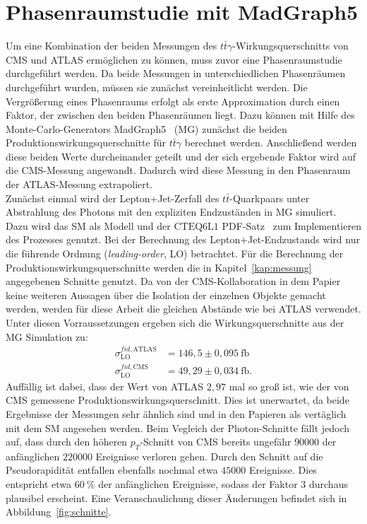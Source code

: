\section{Phasenraumstudie mit MadGraph5}
\label{phasencms}
Um eine Kombination der beiden Messungen des $t\bar{t}\gamma$-Wirkungsquerschnitts von CMS und ATLAS ermöglichen zu können, muss zuvor eine Phasenraumstudie durchgeführt werden. Da beide Messungen in unterschiedlichen Phasenräumen durchgeführt wurden, müssen sie zunächst vereinheitlicht werden. Die Vergrößerung eines Phasenraums erfolgt als erste Approximation durch einen Faktor, der zwischen den beiden Phasenräumen liegt. Dazu können mit Hilfe des Monte-Carlo-Generators MadGraph5~\cite{Alwall:2014hca} (MG) zunächst die beiden Produktionswirkungsquerschnitte für $t\bar{t}\gamma$ berechnet werden.
Anschließend werden diese beiden Werte durcheinander geteilt und der sich ergebende Faktor wird auf die CMS-Messung angewandt. Dadurch wird diese Messung in den Phasenraum der ATLAS-Messung extrapoliert.\\
Zunächst einmal wird der Lepton+Jet-Zerfall des $t\bar{t}$-Quarkpaars unter Abstrahlung des Photons mit den expliziten Endzuständen in MG simuliert.
Dazu wird das SM als Modell und der $\text{CTEQ}6\text{L}1$ PDF-Satz~\cite{Pumplin:2002vw} zum Implementieren des Prozesses genutzt. Bei der Berechnung des Lepton+Jet-Endzustands wird nur die führende Ordnung (\textit{leading-order}, LO) betrachtet. Für die Berechnung der Produktionswirkungsquerschnitte werden die in Kapitel~\ref{kap:messung} angegebenen Schnitte genutzt.
Da von der CMS-Kollaboration in dem Papier keine weiteren Aussagen über die Isolation der einzelnen Objekte gemacht werden, werden für diese Arbeit die gleichen Abstände wie bei ATLAS verwendet.
Unter diesen Vorraussetzungen ergeben sich die Wirkungsquerschnitte aus der MG Simulation zu:
\begin{align}
  \sigma^{fid, \text{ATLAS}}_{\text{LO}} &= 146,5 \pm 0,095~ \si{\femto\barn}\\
  \sigma^{fid, \text{CMS}}_{\text{LO}} &= 49,29 \pm 0,034~ \si{\femto\barn}.
\end{align}
Auffällig ist dabei, dass der Wert von ATLAS $2,97$ mal so groß ist, wie der von CMS gemessene Produktionswirkungsquerschnitt. Dies ist unerwartet, da beide Ergebnisse der Messungen sehr ähnlich sind und in den Papieren als vertäglich mit dem SM angesehen werden.
Beim Vegleich der Photon-Schnitte fällt jedoch auf, dass durch den höheren $p_T$-Schnitt von CMS bereits ungefähr $90000$ der anfänglichen $220000$ Ereignisse verloren gehen. Durch den Schnitt auf die Pseudorapidität entfallen ebenfalls nochmal etwa $45000$ Ereignisse. Dies entspricht etwa $\SI{60}{\percent}$ der anfänglichen Ereignisse, sodass der Faktor $3$ durchaus plausibel erscheint. Eine Veranschaulichung dieser Änderungen befindet sich in Abbildung~\ref{fig:schnitte}.\\
